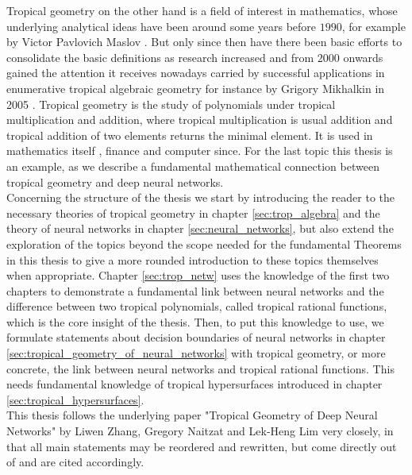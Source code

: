 \documentclass{article}
\theoremstyle{definition}
\begin{document}
Tropical geometry on the other hand is a field of interest in mathematics, whose underlying analytical ideas have been around some years before $1990$, for example by Victor Pavlovich Maslov \cite{maslov1985new}. But only since then have there been basic efforts to consolidate the basic definitions as research increased and from $2000$ onwards gained the attention it receives nowadays carried by successful applications in enumerative tropical algebraic geometry for instance by Grigory Mikhalkin in 2005 \cite{mikhalkin2005enumerative}. 
Tropical geometry is the study of polynomials under tropical multiplication and addition, where tropical multiplication is usual addition and tropical addition of two elements returns the minimal element. It is used in mathematics itself \cite{krivulin2014tropical}, finance \cite{klemperer2009new} and computer since. For the last topic this thesis is an example, as we describe a fundamental mathematical connection between tropical geometry and deep neural networks. \\

Concerning the structure of the thesis we start by introducing the reader to the necessary theories of tropical geometry in chapter \ref{sec:trop_algebra} and the theory of neural networks in chapter \ref{sec:neural_networks}, but also extend the exploration of the topics beyond the scope needed for the fundamental Theorems in this thesis to give a more rounded introduction to these topics themselves when appropriate. Chapter \ref{sec:trop_netw} uses the knowledge of the first two chapters to demonstrate a fundamental link between neural networks and the difference between two tropical polynomials, called tropical rational functions, which is the core insight of the thesis.
Then, to put this knowledge to use, we formulate statements about decision boundaries of neural networks in chapter \ref{sec:tropical_geometry_of_neural_networks} with tropical geometry, or more concrete, the link between neural networks and tropical rational functions. This needs fundamental knowledge of tropical hypersurfaces introduced in chapter \ref{sec:tropical_hypersurfaces}. \\

This thesis follows the underlying paper "Tropical Geometry of Deep Neural Networks" by Liwen Zhang, Gregory Naitzat and Lek-Heng Lim very closely, in that all main statements may be reordered and rewritten, but come directly out of \cite{maclagan2015introduction} and are cited accordingly.

\newpage
\end{document}
